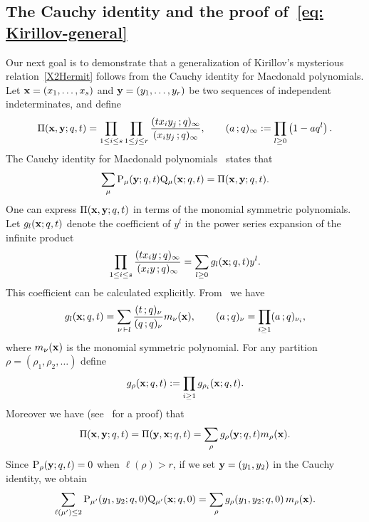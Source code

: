\documentclass[12pt,a4paper,reqno]{amsart}
\theoremstyle{plain}
\theoremstyle{definition}
\newcommand{\1}{\mathds{1}}
\renewcommand{\P}{\mathrm{P}}
\newcommand{\Q}{\mathrm{Q}}
\newcommand{\x}{{\bf x}}
\newcommand{\y}{{\bf y}}
\begin{document}
\subsection{The Cauchy identity  and the proof of~\cref{eq: Kirillov-general}}
Our next goal is to demonstrate that a generalization of Kirillov's mysterious 
relation~\cref{X2Hermit}
follows from  the Cauchy identity for Macdonald polynomials. Let $\x=(x_1,\dots,x_s)$ and $\y=(y_1,\dots,y_r)$ be two sequences of independent indeterminates, and define 
\begin{equation}\label{PI}
    \Pi(\x,\y; q,t)=\prod_{1\leq i\leq s}\prod_{1\leq j\leq r}\frac{(tx_iy_j\, ;q )_\infty}{(x_iy_j\, ; q)_\infty},\qquad (a\, ; q)_\infty :=\prod_{l\geq 0}\left(1-aq^l\right).
\end{equation}
The Cauchy identity for Macdonald polynomials~\cite[p. 324, Eq. (4.13)]{Macdonald}
 states that
 \begin{equation*}
    \sum_{\mu}\P_\mu(\y;q,t)\Q_\mu(\x; q,t)=\Pi(\x,\y; q,t). 
\end{equation*}
One can express $\Pi(\x,\y; q,t)$ in terms of the monomial symmetric polynomials. Let $g_l(\x; q, t)$ denote the coefficient of $y^l$ in the power series expansion of the infinite product
\begin{equation}\label{gm:dif}  
\prod_{1\leq i\leq s}\frac{(tx_iy\, ;q )_\infty}{(x_iy\, ; q)_\infty}=\sum_{l\geq 0}g_l(\x; q,t)y^l.
\end{equation}
This coefficient can be calculated explicitly. From~\cite[p. 314, Example 1]{Macdonald} we have
\begin{equation}\label{g_m}
    g_l(\x; q,t)=\sum_{\nu \,\vdash l}\frac{(t\,;q)_\nu}{(q\,;q)_\nu} m_\nu(\x),\qquad (a\, ; q)_\nu=\prod_{i\geq 1}(a\, ; q)_{\nu_i},
\end{equation}
where $m_{\nu}(\x)$ is the monomial symmetric polynomial. For any partition $\rho=(\rho_1,\rho_2,\dots)$ define
$$
g_{\rho}(\x; q,t):=\prod_{i\geq 1}g_{\rho_i}(\x; q,t).
$$
Moreover we have (see~\cite[p. 311, Eq. (2.10)]{Macdonald} for a proof) that
\begin{equation}
    \Pi(\x,\y; q,t)=\Pi(\y,\x; q,t)=\sum_{\rho}g_\rho(\y;q,t)m_\rho({\bf \x}).
\end{equation}
Since $\P_\rho({\bf y}; q,t)=0$ when $\ell(\rho)>r$, if we set ${\bf y}=(y_1,y_2)$ in the Cauchy identity, we obtain 
\begin{equation}\label{Cauchy}
    \sum_{\ell(\mu')\leq 2}\P_{\mu'}(y_1,y_2;q,0)\Q_{\mu'}(\x;q,0)=\sum_{\rho}g_{\rho}(y_1,y_2; q,0)\, m_{\rho}(\x).
\end{equation}
\end{document}
